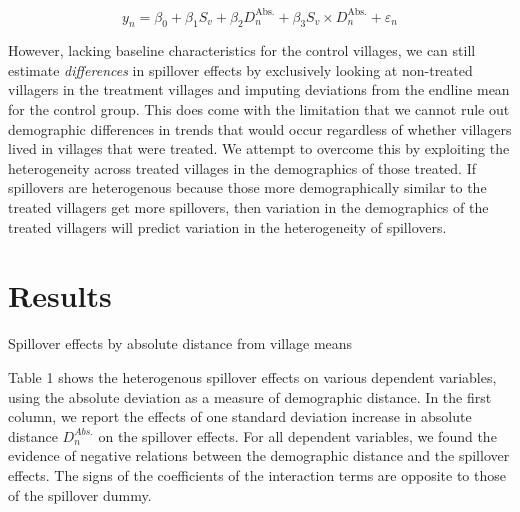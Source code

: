 \documentclass[11pt]{article}
\begin{document}
    \begin{equation*}
    y_n = \beta_0 + \beta_1 S_v + \beta_2 D^\text{Abs.}_n + \beta_3 S_v \times D^\text{Abs.}_n + \varepsilon_n
    \end{equation*}
    
    However, lacking baseline characteristics for the control villages, we can still estimate \textit{differences} in spillover effects by exclusively looking at non-treated villagers in the treatment villages and imputing deviations from the endline mean for the control group. This does come with the limitation that we cannot rule out demographic differences in trends that would occur regardless of whether villagers lived in villages that were treated. We attempt to overcome this by exploiting the heterogeneity across treated villages in the demographics of those treated. If spillovers are heterogenous because those more demographically similar to the treated villagers get more spillovers, then variation in the demographics of the treated villagers will predict variation in the heterogeneity of spillovers.
\section{Results}


\begin{table}[H]
	\centering
	\caption{Spillover effects by absolute distance from village means}
\end{table}

Table 1 shows the heterogenous spillover effects on various dependent variables, using the absolute deviation as a measure of demographic distance. In the first column, we report the effects of one standard deviation increase in absolute distance  $D_n^{Abs.}$ on the spillover effects. For all dependent variables, we found the evidence of negative relations between the demographic distance and the spillover effects. The signs of the coefficients of the interaction terms are opposite to those of the spillover dummy. \\
\end{document}
